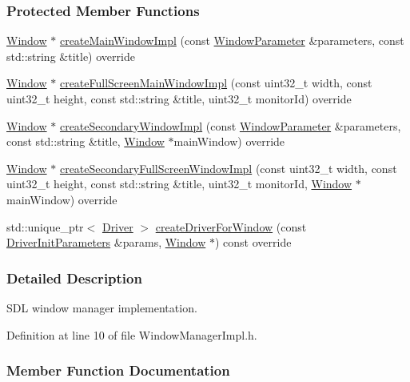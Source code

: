 \subsubsection*{Protected Member Functions}
\begin{DoxyCompactItemize}
\item 
\hyperlink{a00082}{Window} $\ast$ \hyperlink{a00089_a724b94a86d7fa24a317ca2400e19c3a6}{create\+Main\+Window\+Impl} (const \hyperlink{a00091}{Window\+Parameter} \&parameters, const std\+::string \&title) override
\item 
\hyperlink{a00082}{Window} $\ast$ \hyperlink{a00089_ae345cf8a66a523782ea4920ffaa04f96}{create\+Full\+Screen\+Main\+Window\+Impl} (const uint32\+\_\+t width, const uint32\+\_\+t height, const std\+::string \&title, uint32\+\_\+t monitor\+Id) override
\item 
\hyperlink{a00082}{Window} $\ast$ \hyperlink{a00089_a31aaa0f6700a06b1f6da638577673bce}{create\+Secondary\+Window\+Impl} (const \hyperlink{a00091}{Window\+Parameter} \&parameters, const std\+::string \&title, \hyperlink{a00082}{Window} $\ast$main\+Window) override
\item 
\hyperlink{a00082}{Window} $\ast$ \hyperlink{a00089_a28e27c9fe4ec728ff2a88b3ee7286884}{create\+Secondary\+Full\+Screen\+Window\+Impl} (const uint32\+\_\+t width, const uint32\+\_\+t height, const std\+::string \&title, uint32\+\_\+t monitor\+Id, \hyperlink{a00082}{Window} $\ast$main\+Window) override
\item 
std\+::unique\+\_\+ptr$<$ \hyperlink{a00024}{Driver} $>$ \hyperlink{a00089_ac99173816ec5a2fc4a739aba8b566953}{create\+Driver\+For\+Window} (const \hyperlink{a00028}{Driver\+Init\+Parameters} \&params, \hyperlink{a00082}{Window} $\ast$) const  override
\end{DoxyCompactItemize}


\subsubsection{Detailed Description}
S\+DL window manager implementation. 

Definition at line 10 of file Window\+Manager\+Impl.\+h.



\subsubsection{Member Function Documentation}
